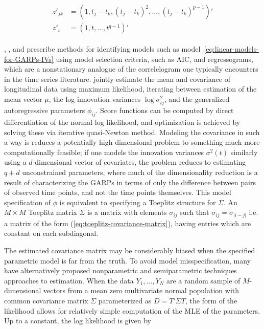 \begin{align}
\begin{split}  \label{eq:GARP-IV-parametric-model}
z'_{jk} &= \left(1, t_j - t_k, \left(t_j - t_k\right)^2,\dots, \left(t_j - t_k\right)^{p-1}\right)' \\
z'_{i}  &= \left(1, t, \dots, t^{q-1}\right)'
\end{split}
\end{align}


\cite{pourahmadi1999joint}, \cite{pourahmadi2000maximum}, and \cite{pan2006regression} prescribe methods for identifying models such as model~\ref{eq:linear-models-for-GARPs-IVs} using model selection criteria, such as AIC, and regressograms, which are a nonstationary analogue of the correlelogram one typically encounters in the time series literature. \cite{pan2003modelling} jointly estimate the mean and covariance of longitudinal data using maximum likelihood, iterating between estimation of the mean vector $\mu$, the log innovation variances $\log \sigma_{ij}^2$, and the generalized autoregressive parameters $\phi_{ij}$. Score functions can be computed  by direct differentiation of the normal log likelihood, and optimization is achieved by solving these via iterative quasi-Newton method.  Modeling the covariance in such a way is reduces a potentially high dimensional problem to something much more computationally feasible; if one models the innovation variances $\sigma^2\left(t\right)$ similarly using a $d$-dimensional vector of covariates, the problem reduces to estimating $q+d$ unconstrained parameters, where much of the dimensionality reduction is a result of characterizing the GARPs in terms of only the difference between pairs of observed time points, and not the time points themselves.  This model specification of $\phi$ is equivalent to specifying a Toeplitz structure for $\Sigma$. An $M \times M$ Toeplitz matrix $\Sigma$ is a matrix with elements $\sigma_{ij}$ such that $\sigma_{ij} = \sigma_{\vert i-j \vert}$ i.e. a matrix of the form (\ref{eq:toeplitz-covariance-matrix}), having entries which are constant on each subdiagonal.

\bigskip

The estimated covariance matrix may be considerably biased when the specified parametric model is far from the truth. To avoid model misspecification, many have alternatively  proposed nonparametric and semiparametric techniques approaches to estimation.  When the data $Y_1,\dots , Y_N$ are a random sample of $M$-dimensional vectors from a mean zero multivariate normal population with common covariance matrix $\Sigma$ parameterized as $D = T'\Sigma T$, the form of the likelihood allows for relatively simple computation of the MLE of the parameters. Up to a constant, the log likelihood is given by 

